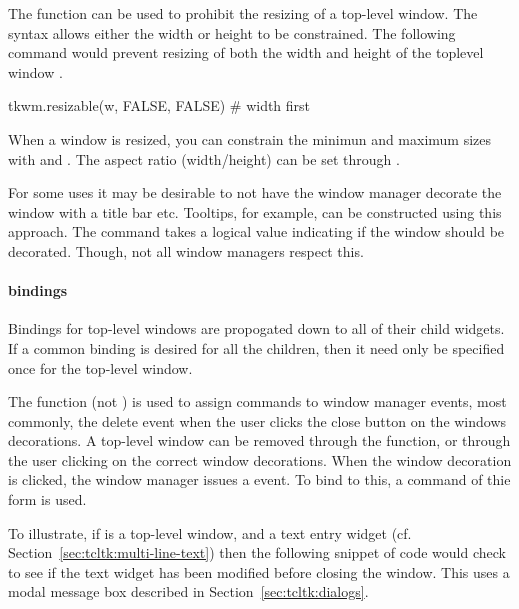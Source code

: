 The  function can be used to prohibit the
resizing of a top-level window. The syntax allows either the width or
height to be constrained. The following command would  prevent
resizing of both the width and height of the toplevel window . 

\begin{Schunk}
  \begin{Sinput}
tkwm.resizable(w, FALSE, FALSE)    # width first
  \end{Sinput}
\end{Schunk}
%
When a window is resized, you can constrain the minimun and maximum
sizes with  and . The
aspect ratio (width/height) can be set through .


For some uses it may be desirable to not have the window manager
decorate the window with a title bar etc. Tooltips, for example, can
be constructed using this approach. The command  takes a logical value
indicating if the window should be decorated. Though, not all window
managers respect this.



\paragraph{bindings}
Bindings for top-level windows are propogated down to all of their
child widgets. If a common binding is desired for all the children,
then it need only be specified once for the top-level window.


The  function (not ) is used
to assign commands to window manager events, most commonly, the delete
event when the user clicks the close button on the windows
decorations. A top-level window can be removed through the
 function, or through the user clicking on the
correct window decorations. When the window decoration is clicked, the
window manager issues a  event. To bind to
this, a command of thie form
 is used.

To illustrate, if  is a top-level window, and
 a text entry widget
(cf. Section~\ref{sec:tcltk:multi-line-text}) then the following
snippet of code would check to see if the text widget has been
modified before closing the window. This uses a modal message box
described in Section~\ref{sec:tcltk:dialogs}.



